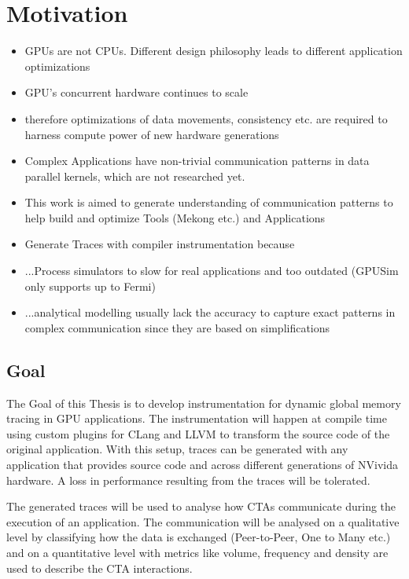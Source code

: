 \chapter{Motivation}
\begin{itemize}
	\item GPUs are not CPUs. Different design philosophy leads to different application optimizations
	\item GPU's concurrent hardware continues to scale
	\item therefore optimizations of data movements, consistency etc. are required to harness compute power of new hardware generations
	\item Complex Applications have non-trivial communication patterns in data parallel kernels, which are not researched yet.
	\item This work is aimed to generate understanding of communication patterns to help build and optimize Tools (Mekong etc.) and Applications
	\item Generate Traces with compiler instrumentation because
	\item ...Process simulators to slow for real applications and too outdated (GPUSim only supports up to Fermi)
	\item ...analytical modelling usually lack the accuracy to capture exact patterns in complex communication since they are based on simplifications
	
\end{itemize}
\section{Goal}
The Goal of this Thesis is to develop instrumentation for dynamic global memory tracing in GPU applications. The instrumentation will happen at compile time using custom plugins for CLang and LLVM to transform the source code of the
original application. With this setup, traces can be generated with any application that provides source code and
across different generations of NVivida hardware. A loss in performance resulting from the traces will be tolerated.

The generated traces will be used to analyse how CTAs communicate during the execution of an application. 
The communication will be analysed on a qualitative level by classifying how the data is exchanged (Peer-to-Peer, One to Many etc.) and on a quantitative level with metrics like volume, frequency and density are used to describe the CTA interactions.

